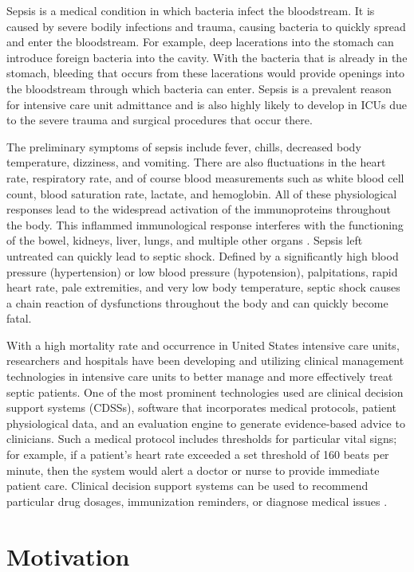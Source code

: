 \documentclass{sig-alternate}
\begin{document}
Sepsis is a medical condition in which bacteria infect the bloodstream. It is caused by severe bodily infections and trauma, causing bacteria to quickly spread and enter the bloodstream. For example, deep lacerations into the stomach can introduce foreign bacteria into the cavity. With the bacteria that is already in the stomach, bleeding that occurs from these lacerations would provide openings into the bloodstream through which bacteria can enter. Sepsis is a prevalent reason for intensive care unit admittance and is also highly likely to develop in ICUs due to the severe trauma and surgical procedures that occur there. 

The preliminary symptoms of sepsis include fever, chills, decreased body temperature, dizziness, and vomiting. There are also fluctuations in the heart rate, respiratory rate, and of course blood measurements such as white blood cell count, blood saturation rate, lactate, and hemoglobin. All of these physiological responses lead to the widespread activation of the immunoproteins throughout the body. This inflammed immunological response interferes with the functioning of the bowel, kidneys, liver, lungs, and multiple other organs \cite{statins}. Sepsis left untreated can quickly lead to septic shock. Defined by a significantly high blood pressure (hypertension) or low blood pressure (hypotension), palpitations, rapid heart rate, pale extremities, and very low body temperature, septic shock causes a chain reaction of dysfunctions throughout the body and can quickly become fatal.

With a high mortality rate and occurrence in United States intensive care units, researchers and hospitals have been developing and utilizing clinical management technologies in intensive care units to better manage and more effectively treat septic patients. One of the most prominent technologies used are clinical decision support systems (CDSSs), software that incorporates medical protocols, patient physiological data, and an evaluation engine to generate evidence-based advice to clinicians. Such a medical protocol includes thresholds for particular vital signs; for example, if a patient's heart rate exceeded a set threshold of 160 beats per minute, then the system would alert a doctor or nurse to provide immediate patient care. Clinical decision support systems can be used to recommend particular drug dosages, immunization reminders, or diagnose medical issues \cite{ssc}. 

\vspace{10pt}
\section{Motivation}
\vspace{10pt}
\label{sec:motivation}
\end{document}
